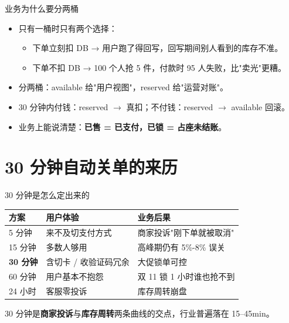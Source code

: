\begin{frame}{业务为什么要分两桶}
\begin{itemize}
  \item 只有一桶时只有两个选择：
  \begin{itemize}
    \item 下单立刻扣 DB → 用户跑了得回写，回写期间别人看到的库存不准。
    \item 下单不扣 DB → 100 个人抢 5 件，付款时 95 人失败，比"卖光"更糟。
  \end{itemize}
  \item 分两桶：available 给"用户视图"，reserved 给"运营对账"。
  \item 30 分钟内付钱：reserved $\to$ 真扣；不付钱：reserved $\to$ available 回滚。
  \item 业务上能说清楚：\textbf{已售 = 已支付，已锁 = 占座未结账}。
\end{itemize}
\end{frame}

\section{30 分钟自动关单的来历}

\begin{frame}{30 分钟是怎么定出来的}
\begin{tabular}{@{}llp{4.5cm}@{}}
\toprule
方案 & 用户体验 & 业务后果 \\
\midrule
5 分钟   & 来不及切支付方式      & 商家投诉"刚下单就被取消" \\
15 分钟  & 多数人够用           & 高峰期仍有 5\%-8\% 误关 \\
\textbf{30 分钟}  & 含切卡 / 收验证码冗余 & 大促锁单可控 \\
60 分钟  & 用户基本不抱怨        & 双 11 锁 1 小时谁也抢不到 \\
24 小时  & 客服零投诉           & 库存周转崩盘 \\
\bottomrule
\end{tabular}
\vspace{2mm}
\small 30 分钟是\textbf{商家投诉}与\textbf{库存周转}两条曲线的交点，行业普遍落在 15--45min。
\end{frame}

